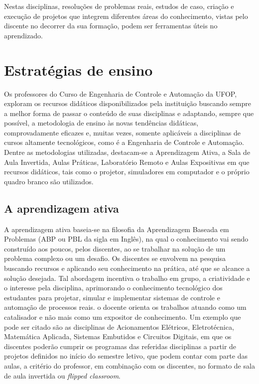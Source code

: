 \documentclass[
	12pt,				%
	openright,			%
	oneside,			%
	a4paper,			%
	english,			%
	brazil				%
	]{abntex2}
\begin{document}
Nestas disciplinas, resoluções de problemas reais, estudos de caso, criação e execução de projetos que integrem diferentes áreas do conhecimento, vistas pelo discente no decorrer da sua formação, podem ser ferramentas úteis no aprendizado.

\section{Estratégias de ensino}

Os professores do Curso de Engenharia de Controle e Automação da UFOP, exploram os recursos didáticos disponibilizados pela instituição buscando sempre a melhor forma de passar o conteúdo de suas disciplinas e adaptando, sempre que possível, a metodologia de ensino às novas tendências didáticas, comprovadamente eficazes e, muitas vezes, somente aplicáveis a disciplinas de cursos  altamente tecnológicos, como é a Engenharia de Controle e Automação. Dentre as metodologias utilizadas, destacam-se a Aprendizagem Ativa, a Sala de Aula Invertida, Aulas Práticas, Laboratório Remoto e Aulas Expositivas em que recursos didáticos, tais como o projetor, simuladores em computador e o próprio quadro branco são utilizados.

\subsection*{A aprendizagem ativa}

A aprendizagem ativa baseia-se na filosofia da Aprendizagem Baseada em Problemas (ABP ou PBL da sigla em Inglês), na qual o conhecimento vai sendo construído aos poucos, pelos discentes, ao se trabalhar na solução de um problema complexo ou um desafio. Os discentes se envolvem na pesquisa buscando recursos e aplicando seu conhecimento na prática, até que se alcance a solução desejada. Tal abordagem incentiva o trabalho em grupo, a criatividade e o interesse pela disciplina, aprimorando o conhecimento tecnológico dos estudantes para projetar, simular e implementar sistemas de controle e automação de processos reais. o docente orienta os trabalhos atuando como um catalisador e não mais como um expositor de conhecimento. Um exemplo que pode ser citado são as disciplinas de Acionamentos Elétricos, Eletrotécnica, Matemática Aplicada, Sistemas Embutidos e Circuitos Digitais, em que os discentes poderão cumprir os programas das referidas disciplinas a partir de projetos definidos no início do semestre letivo, que podem contar com parte das aulas, a critério do professor, em combinação com os discentes, no formato de sala de aula invertida ou \textit{flipped classroom}.
\end{document}
